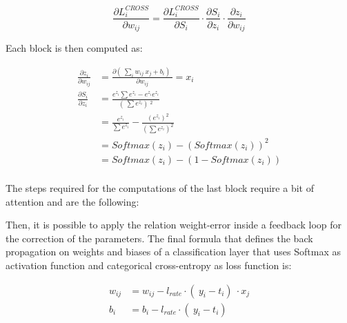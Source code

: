 \documentclass[12pt]{report}
\begin{document}
\begin{equation}
	\frac{\partial L^{CROSS}_i}{\partial w_{ij}} = \frac{\partial L^{CROSS}_i}{\partial S_i} \cdot \frac{\partial S_i}{\partial z_i} \cdot \frac{\partial z_i}{\partial w_{ij}}  
\end{equation}

Each block is then computed as:

\begin{align}
	\frac{\partial z_i}{\partial w_{ij}} &= \frac{ \partial (\ \sum_i w_{ij} \: x_j + b_i )\ }{ \partial w_{ij}} = x_i \\[10pt]
	\frac{\partial S_i}{\partial z_i} &= \frac{e^{z_i} \sum e^{z_i} - e^{z_i} e^{z_i}}{ (\ \sum e^{z_i} )\ ^2} \nonumber \\
	&= \frac{e^{z_i}}{\sum e^{z_i}}- \frac{(e^{z_i})^2}{(\sum e^{z_i})^2} \nonumber \\
	&= Softmax(z_i) - (Softmax(z_i))^2 \nonumber \\
	&= Softmax(z_i) - (1-Softmax(z_i)) \\[10pt]
\end{align}

The steps required for the computations of the last block require a bit of attention and are the following:

	

Then, it is possible to apply the relation weight-error inside a feedback loop for the correction of the parameters. The final formula that defines the back propagation on weights and biases of a classification layer that uses Softmax as activation function and categorical cross-entropy as loss function is:

\begin{align}
	w_{ij} &= w_{ij} - l_{rate} \cdot (\ y_i-t_i )\ \cdot x_j \label{w_update} \\
	b_i    &= b_i    - l_{rate} \cdot (\ y_i-t_i )\ \label{b_update} 
\end{align}
\end{document}
